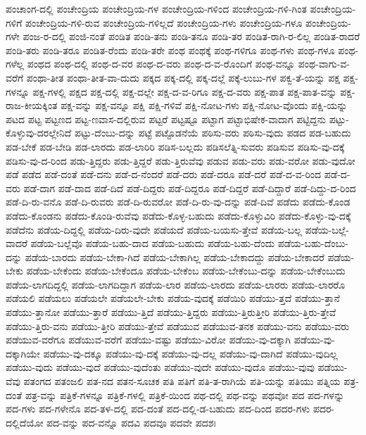 {ಪಂಚಾಂಗ-ದಲ್ಲಿ
ಪಂಚೇಂದ್ರಿಯ
ಪಂಚೇಂದ್ರಿಯ-ಗಳ
ಪಂಚೇಂದ್ರಿಯ-ಗಳಿಂದ
ಪಂಚೇಂದ್ರಿಯ-ಗಳಿ-ಗಿಂತ
ಪಂಚೇಂದ್ರಿಯ-ಗಳಿಗೆ
ಪಂಚೇಂದ್ರಿಯ-ಗಳಿ-ರುವ
ಪಂಚೇಂದ್ರಿಯ-ಗಳಿಲ್ಲದೆ
ಪಂಚೇಂದ್ರಿಯ-ಗಳು
ಪಂಚೇಂದ್ರಿಯ-ಗಳೂ
ಪಂಚೇಂದ್ರಿಯ-ಗಳೇ
ಪಂಜ-ರ-ದಲ್ಲಿ
ಪಂಜಿ-ನಂತೆ
ಪಂಡಿತ
ಪಂಡಿ-ತನು
ಪಂಡಿ-ತನೂ
ಪಂಡಿ-ತರ
ಪಂಡಿತ-ರಾಗಿ-ರ-ಲಿಲ್ಲ
ಪಂಡಿತ-ರಾದರೆ
ಪಂಡಿ-ತರು
ಪಂಡಿ-ತರೂ
ಪಂಡಿತ-ರೆಂದು
ಪಂಡಿ-ತರೇ
ಪಂಥ
ಪಂಥಕ್ಕೆ
ಪಂಥ-ಗಳಿಗೂ
ಪಂಥ-ಗಳು
ಪಂಥ-ಗಳೂ
ಪಂಥ-ಗಳೆಲ್ಲ
ಪಂಥದ
ಪಂಥ-ದಲ್ಲಿ
ಪಂಥ-ದ-ವರ
ಪಂಥ-ದ-ವರು
ಪಂಥ-ದ-ವ-ರೊಂದಿಗೆ
ಪಂಥ-ವನ್ನೂ
ಪಂಥ-ವಾಗು-ವ-ವರೆಗೆ
ಪಂಥಾ-ತೀತ
ಪಂಥಾ-ತೀತ-ವಾ-ದುದು
ಪಕ್ಕದ
ಪಕ್ಕ-ದಲ್ಲಿ
ಪಕ್ಕ-ದಲ್ಲೆ
ಪಕ್ಕೆ-ಲುಬು-ಗಳ
ಪಕ್ವ-ತೆ-ಯನ್ನು
ಪಕ್ಷ
ಪಕ್ಷ-ಗಳನ್ನೂ
ಪಕ್ಷ-ಗಳಲ್ಲಿ
ಪಕ್ಷದ
ಪಕ್ಷ-ದಲ್ಲಿ
ಪಕ್ಷ-ದಲ್ಲೇ
ಪಕ್ಷ-ದ-ವ-ರಿಗೂ
ಪಕ್ಷ-ದ-ವರು
ಪಕ್ಷ-ಪಾತ
ಪಕ್ಷ-ಪಾತ-ವನ್ನು
ಪಕ್ಷ-ರಾಜ-ಕೀಯಕ್ಕಿಂತ
ಪಕ್ಷ-ವನ್ನು
ಪಕ್ಷ-ವನ್ನೂ
ಪಕ್ಷಿ
ಪಕ್ಷಿ-ಗಳಿವೆ
ಪಕ್ಷಿ-ನೋಟ-ಗಳು
ಪಕ್ಷಿ-ನೋಟ-ವೊಂದು
ಪಕ್ಷಿ-ಯನ್ನು
ಪಟದ
ಪಟ್ಟ
ಪಟ್ಟಣದ
ಪಟ್ಟ-ಣವಾಸ-ದಲ್ಲಿರುವ
ಪಟ್ಟರೆ
ಪಟ್ಟಷ್ಟೂ
ಪಟ್ಟಾಗ
ಪಟ್ಟಾಭಿಷೇಕ-ವಾದಾಗ
ಪಟ್ಟಿದ್ದನು
ಪಟ್ಟು-ಕೊಳ್ಳುವು-ದರಲ್ಲೇನಿದೆ
ಪಟ್ಟು-ದೆಂಬು-ದನ್ನು
ಪಟ್ಟೆ
ಪಟ್ಟೊಡನೆಯೆ
ಪಠಿಸು-ವರು
ಪಠಿಸು-ವುದು
ಪಡದ
ಪಡ-ಬಹುದು
ಪಡ-ಬೇಕೆ
ಪಡ-ಬೇಡಿ
ಪಡ-ಲಾರದು
ಪಡ-ಲಾರಿರಿ
ಪಡಿಸ-ಬಲ್ಲದು
ಪಡಿಸಲೆತ್ನಿ-ಸುವರು
ಪಡಿಸುವ
ಪಡಿಸು-ವು-ದಕ್ಕೆ
ಪಡಿಸು-ವು-ದ-ರಿಂದ
ಪಡು-ತ್ತಿದ್ದರು
ಪಡು-ತ್ತಿದ್ದರೆ
ಪಡು-ತ್ತಿರುವೆವು
ಪಡುವ
ಪಡು-ವರು
ಪಡು-ವರೋ
ಪಡು-ವುದೋ
ಪಡೆ
ಪಡೆದ
ಪಡೆ-ದಂತೆ
ಪಡೆ-ದನು
ಪಡೆ-ದ-ನೆಂದರೆ
ಪಡೆ-ದರು
ಪಡೆ-ದರೂ
ಪಡೆ-ದರೆ
ಪಡೆ-ದ-ವ-ರಿಂದ
ಪಡೆ-ದ-ವರು
ಪಡೆ-ದಾಗ
ಪಡೆ-ದಾದ
ಪಡೆ-ದಿದೆ
ಪಡೆ-ದಿದ್ದರು
ಪಡೆ-ದಿದ್ದರೂ
ಪಡೆ-ದಿದ್ದರೆ
ಪಡೆ-ದಿದ್ದಾರೆ
ಪಡೆ-ದಿದ್ದು-ದ-ರಿಂದ
ಪಡೆ-ದಿ-ರು-ವನೊ
ಪಡೆ-ದಿ-ರುವರು
ಪಡೆ-ದಿ-ರುವರೋ
ಪಡೆ-ದಿ-ರು-ವು-ದನ್ನು
ಪಡೆ-ದಿವೆ
ಪಡೆದು
ಪಡೆದು-ಕೊಂಡ
ಪಡೆದು-ಕೊಂಡನು
ಪಡೆದು-ಕೊಂಡಿ-ರುವೆವು
ಪಡೆದು-ಕೊಳ್ಳ-ಬಹುದು
ಪಡೆದು-ಕೊಳ್ಳುವಿರಿ
ಪಡೆದು-ಕೊಳ್ಳು-ವು-ದಕ್ಕೆ
ಪಡೆದೆನು
ಪಡೆಯ-ದಿದ್ದಲ್ಲಿ
ಪಡೆಯ-ದಿರು-ವುದೇ
ಪಡೆಯದೆ
ಪಡೆಯ-ಬಯಸು-ತ್ತೇವೆ
ಪಡೆಯ-ಬಲ್ಲ
ಪಡೆಯ-ಬಲ್ಲೆ-ವಾದರೆ
ಪಡೆಯ-ಬಲ್ಲೆವೊ
ಪಡೆಯ-ಬಹು-ದಾದ
ಪಡೆಯ-ಬಹುದು
ಪಡೆಯ-ಬಹು-ದೆಂದು
ಪಡೆಯ-ಬಹು-ದೆಂಬು-ದನ್ನು
ಪಡೆಯ-ಬಾರದು
ಪಡೆಯ-ಬೇಕಾ-ಗಿದೆ
ಪಡೆಯ-ಬೇಕಾಗಿಲ್ಲ
ಪಡೆಯ-ಬೇಕಾದದ್ದು
ಪಡೆಯ-ಬೇಕಾದರೆ
ಪಡೆಯ-ಬೇಕು
ಪಡೆಯ-ಬೇಕೆಂದು
ಪಡೆಯ-ಬೇಕೆಂದೂ
ಪಡೆಯ-ಬೇಕೆಂಬ
ಪಡೆಯ-ಬೇಕೆಂಬು-ದನ್ನು
ಪಡೆಯ-ಬೇಕೆಂಬುದು
ಪಡೆಯ-ಲಾಗದಿದ್ದಲ್ಲಿ
ಪಡೆಯ-ಲಾಗದಿದ್ದಾಗ
ಪಡೆಯ-ಲಾರ
ಪಡೆಯ-ಲಾರದು
ಪಡೆಯ-ಲಾರರು
ಪಡೆಯ-ಲಾರರೊ
ಪಡೆಯಲಿ
ಪಡೆಯಲು
ಪಡೆಯಲೇ
ಪಡೆಯಲೇ-ಬೇಕು
ಪಡೆಯ-ವುದಕ್ಕೆ
ಪಡೆಯಿರಿ
ಪಡೆಯು-ತ್ತದೆ
ಪಡೆಯು-ತ್ತಾನೆ
ಪಡೆಯು-ತ್ತಾನೋ
ಪಡೆಯು-ತ್ತಾರೆ
ಪಡೆಯು-ತ್ತಿದೆ
ಪಡೆಯು-ತ್ತಿದ್ದರು
ಪಡೆಯು-ತ್ತಿರುತ್ತೀರಿ
ಪಡೆಯು-ತ್ತಿರು-ತ್ತೇವೆ
ಪಡೆಯು-ತ್ತಿರು-ವನು
ಪಡೆಯು-ತ್ತೀರಿ
ಪಡೆಯು-ತ್ತೇವೆ
ಪಡೆಯುವ
ಪಡೆಯುವ-ತನಕ
ಪಡೆಯು-ವನು
ಪಡೆಯು-ವರು
ಪಡೆಯುವ-ವರೆಗೂ
ಪಡೆಯುವ-ವರೆಗೆ
ಪಡೆಯು-ವಷ್ಟು
ಪಡೆಯು-ವಿರೋ
ಪಡೆಯು-ವು-ದಕ್ಕಾಗಿ
ಪಡೆಯು-ವು-ದಕ್ಕಾಗಿಯೇ
ಪಡೆಯು-ವು-ದಕ್ಕೂ
ಪಡೆಯು-ವು-ದಕ್ಕೆ
ಪಡೆಯು-ವು-ದಲ್ಲ
ಪಡೆಯು-ವು-ದಾಗಿದೆ
ಪಡೆಯು-ವುದಿಲ್ಲ
ಪಡೆಯು-ವುದು
ಪಡೆಯು-ವುದೆ
ಪಡೆಯು-ವುದೆಂತು
ಪಡೆಯು-ವುದೇ
ಪಡೆಯು-ವುದೊ
ಪಡೆಯು-ವುವು
ಪಡೆಯು-ವೆವು
ಪತಂಗದ
ಪತಂಜಲಿ
ಪತ-ನದ
ಪತನ-ಸೂಚಕ
ಪತಿ
ಪತಿಗೆ
ಪತಿ-ತ-ರಾಗಿಯೆ
ಪತಿ-ಯನ್ನು
ಪತಿಯು
ಪತ್ನಿಯ
ಪತ್ರ-ದಂತೆ
ಪತ್ರ-ವನ್ನು
ಪತ್ರಿಕೆ-ಗಳನ್ನೂ
ಪತ್ರಿಕೆ-ಗಳಲ್ಲಿ
ಪತ್ರಿಕೆ-ಯಿಂದ
ಪಥ-ದಲ್ಲಿ
ಪಥ-ವನ್ನು
ಪಥವೋ
ಪದ
ಪದ-ಗಳನ್ನು
ಪದ-ಗಳು
ಪದ-ಗಳೇನೊ
ಪದ-ತಳ-ದಲ್ಲಿ
ಪದ-ದಂತೆ
ಪದ-ದಲ್ಲಿ-ಡ-ಬಹುದು
ಪದ-ದಿಂದ
ಪದರ-ಗಳು
ಪದರ-ದಲ್ಲಿದೆಯೋ
ಪದ-ವನ್ನು
ಪದ-ವನ್ನೊ
ಪದವಿ
ಪದವೂ
ಪದವೇ
ಪದಶಃ
}
